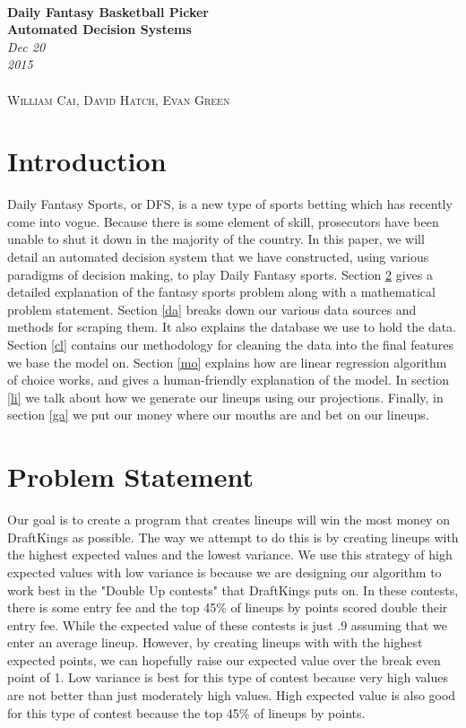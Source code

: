 \documentclass[12pt]{article}
\renewcommand{\=}[1]{\stackrel{#1}{=}} %
\theoremstyle{definition}
\begin{document}
{\noindent\Huge\bf  \\[0.5\baselineskip] {\selectfont Daily Fantasy Basketball Picker}         }\\[2\baselineskip] %
{ {\bf {}\selectfont Automated Decision Systems}\\ {\textit{\selectfont     Dec 20 2015}}}~~~~~~~~~~~~~~~~~~~~~~~~~~~~~~~~~~~~~~~~~~~~~~~~~~~~~~~~~~~~~~~~~~~~~~~~~~~~~\
{\large \textsc{ \\William Cai, David Hatch, Evan Green}} %
\\[1.4\baselineskip] 
\section{Introduction} 
\label{in}
 
Daily Fantasy Sports, or DFS, is a new type of sports betting which has recently come into vogue.  Because there is some element of skill, prosecutors have been unable to shut it down in the majority of the country.  In this paper, we will detail an automated decision system that we have constructed, using various paradigms of decision making, to play Daily Fantasy sports.  Section \ref{ps} gives a detailed explanation of the fantasy sports problem along with a mathematical problem statement.  Section \ref{da} breaks down our various data sources and methods for scraping them.  It also explains the database we use to hold the data.  Section \ref{cl} contains our methodology for cleaning the data into the final features we base the model on.  Section \ref{mo} explains how are linear regression algorithm of choice works, and gives a human-friendly explanation of the model. In section \ref{li} we talk about how we generate our lineups using our projections.  Finally, in section \ref{ga} we put our money where our mouths are and bet on our lineups.  

\section{Problem Statement} 
\label{ps}
Our goal is to create a program that creates lineups will win the most money on DraftKings as possible. The way we attempt to do this is by creating lineups with the highest expected values and the lowest variance. We use this strategy of high expected values with low variance is because we are designing our algorithm to work best in the "Double Up contests" that DraftKings puts on. In these contests, there is some entry fee and the top 45\% of lineups by points scored double their entry fee. While the expected value of these contests is just .9 assuming that we enter an average lineup. However, by creating lineups with with the highest expected points, we can hopefully raise our expected value over the break even point of 1. Low variance is best for this type of contest because very high values are not better than just moderately high values. High expected value is also good for this type of contest because the top 45\% of lineups by points. 
\end{document}

